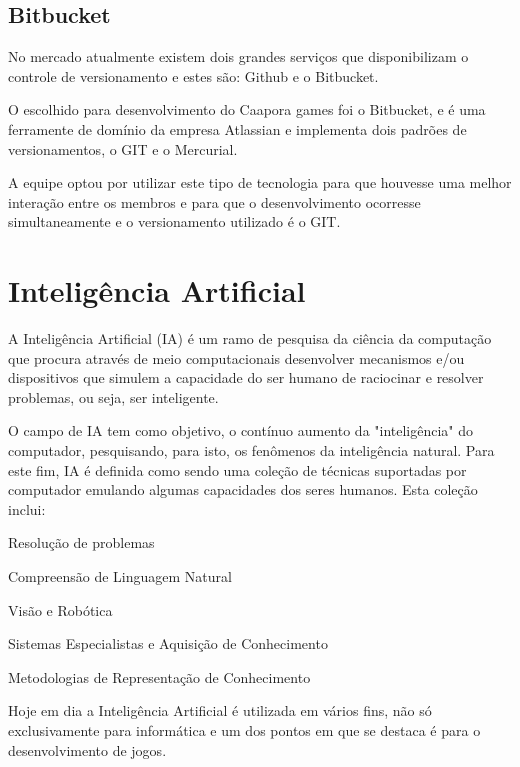 	\subsection{Bitbucket}
	
No mercado atualmente existem dois grandes serviços que disponibilizam o controle de versionamento e estes são: Github e o Bitbucket.

O escolhido para desenvolvimento do Caapora games foi o Bitbucket, e é uma ferramente de domínio da empresa Atlassian e implementa dois padrões de versionamentos, o GIT e o Mercurial.


A equipe optou por utilizar este tipo de tecnologia para que houvesse uma melhor interação entre os membros e para que o desenvolvimento ocorresse simultaneamente e o
versionamento utilizado é o GIT. \cite{bit}

\section{Inteligência Artificial}
\label{sec:inteligencia-artificial}

A Inteligência Artificial (IA) é um ramo de pesquisa da ciência da computação que procura através de meio computacionais desenvolver mecanismos e/ou dispositivos que simulem a capacidade do ser humano de raciocinar e resolver problemas, ou seja, ser inteligente. 

O campo de IA tem como objetivo, o contínuo aumento da "inteligência"  do computador, pesquisando, para isto, os fenômenos da inteligência natural. Para este fim, IA é definida  como sendo uma coleção de técnicas suportadas por computador emulando algumas capacidades dos seres humanos. Esta coleção inclui:

\begin{alineascomponto}
	
   \item Resolução de problemas
   \item Compreensão de Linguagem Natural
   \item Visão e Robótica
   \item Sistemas Especialistas e Aquisição de Conhecimento
   \item Metodologias de Representação de Conhecimento

	\end{alineascomponto}
	
Hoje em dia a Inteligência Artificial é utilizada em vários fins, não só exclusivamente para informática e um dos pontos em que se destaca é para o desenvolvimento de jogos. 

